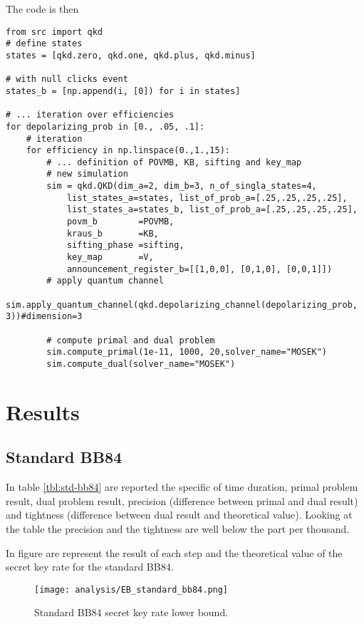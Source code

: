\documentclass{article}
\begin{document}
        The code is then        
        \begin{lstlisting}[style=python]
from src import qkd
# define states
states = [qkd.zero, qkd.one, qkd.plus, qkd.minus]

# with null clicks event
states_b = [np.append(i, [0]) for i in states]

# ... iteration over efficiencies
for depolarizing_prob in [0., .05, .1]:
    # iteration
    for efficiency in np.linspace(0.,1.,15):
        # ... definition of POVMB, KB, sifting and key_map
        # new simulation
        sim = qkd.QKD(dim_a=2, dim_b=3, n_of_singla_states=4,
            list_states_a=states, list_of_prob_a=[.25,.25,.25,.25],
            list_states_a=states_b, list_of_prob_a=[.25,.25,.25,.25],
            povm_b        =POVMB,
            kraus_b       =KB,
            sifting_phase =sifting,
            key_map       =V,
            announcement_register_b=[[1,0,0], [0,1,0], [0,0,1]])
        # apply quantum channel
        sim.apply_quantum_channel(qkd.depolarizing_channel(depolarizing_prob, 3))#dimension=3

        # compute primal and dual problem
        sim.compute_primal(1e-11, 1000, 20,solver_name="MOSEK")
        sim.compute_dual(solver_name="MOSEK")\end{lstlisting}

\section{Results}
 \subsection{Standard BB84}
    In table \ref{tbl:std-bb84} are reported the specific of time duration, primal problem result, dual problem result, precision (difference between primal and dual result) and tightness (difference between dual result and theoretical value).
    Looking at the table the precision and the tightness are well below the part per thousand.
    
    In figure are represent the result of each step and the theoretical value of the secret key rate for the standard BB84.    
    \begin{figure}[h!]
        \centering
        \texttt{[image: analysis/EB\_standard\_bb84.png]}
        \caption{Standard BB84 secret key rate lower bound.}
    \end{figure}
\end{document}
